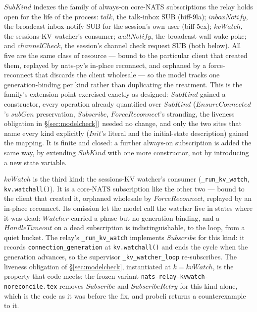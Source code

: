 \documentclass[a4paper,10pt,fleqn]{article}
\begin{document}
$SubKind$ indexes the family of always-on core-NATS subscriptions the
relay holds open for the life of the process: $talk$, the talk-inbox SUB
(biff-9la); $inboxNotify$, the broadcast inbox-notify SUB for the
session's own user (biff-5ex); $kvWatch$, the sessions-KV watcher's
consumer; $wallNotify$, the broadcast wall wake poke; and $channelCheck$,
the session's channel check request SUB (both below).
All five are the same class of resource --- bound to
the particular client that created them, replayed by nats-py's in-place
reconnect, and orphaned by a force-reconnect that discards the client
wholesale --- so the model tracks one generation-binding per kind rather
than duplicating the treatment.  This is the family's extension point
exercised exactly as designed: $SubKind$ gained a constructor, every
operation already quantified over $SubKind$ ($EnsureConnected$'s $subGen$
preservation, $Subscribe$, $ForceReconnect$'s stranding, the liveness
obligation in \S\ref{sec:modelcheck}) needed no change, and only the two
sites that name every kind explicitly ($Init$'s literal and the
initial-state description) gained the mapping.  It is finite and closed:
a further always-on subscription is added the same way, by extending
$SubKind$ with one more constructor, not by introducing a new state
variable.

$kvWatch$ is the third kind: the sessions-KV watcher's consumer
(\texttt{\_run\_kv\_watch}, \texttt{kv.watchall()}).  It is a core-NATS
subscription like the other two --- bound to the client that created it,
orphaned wholesale by $ForceReconnect$, replayed by an in-place reconnect.
Its omission let the model call the watcher live in states where it was
dead: $Watcher$ carried a phase but no generation binding, and a $HandleTimeout$
on a dead subscription is indistinguishable, to the loop, from a quiet
bucket.  The relay's \texttt{\_run\_kv\_watch} implements $Subscribe$ for this
kind: it records \texttt{connection\_generation} at \texttt{kv.watchall()}
and ends the cycle when the generation advances, so the supervisor
\texttt{\_kv\_watcher\_loop} re-subscribes.  The liveness obligation of
\S\ref{sec:modelcheck}, instantiated at $k = kvWatch$, is the property that
code meets; the frozen variant \texttt{nats-relay-kvwatch-noreconcile.tex}
removes $Subscribe$ and $SubscribeRetry$ for this kind alone, which is the
code as it was before the fix, and probcli returns a counterexample to it.
\end{document}
